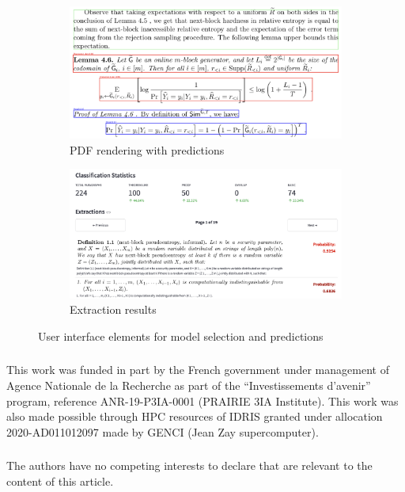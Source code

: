 \documentclass[runningheads]{llncs}
\begin{document}
\begin{figure}
	\vspace{0.5cm}
	\begin{subfigure}[b]{0.48\textwidth}
		\centering
		\includegraphics[width=\textwidth]{images/vis_on_pdf.png}
		\caption{PDF rendering with predictions}
	\end{subfigure}
	\hfill
	\begin{subfigure}[b]{0.48\textwidth}
		\centering
		\includegraphics[width=\textwidth]{images/extractions.png}
		\caption{Extraction results}
	\end{subfigure}
	\caption{User interface elements for model selection and predictions}
	\label{fig:predictions_and_interface}
\end{figure}

\begin{credits}
	\subsubsection{\ackname}
	This work was funded in part by the French government under
	management of Agence Nationale de la Recherche as part of the
	“Investissements d’avenir” program, reference ANR-19-P3IA-0001
	(PRAIRIE 3IA Institute). This work was also made possible through
	HPC resources of IDRIS granted under allocation 2020-AD011012097
	made by GENCI (Jean Zay supercomputer).

	\subsubsection{\discintname}
	The authors have no competing interests to declare that are relevant to
	the content of this article.
\end{credits}

\clearpage



\end{document}
